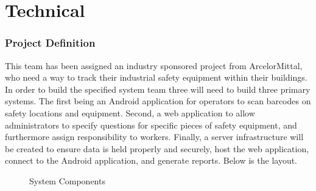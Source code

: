 \documentclass[Letter,11pt]{article}
\begin{document}
\part{Technical}
\section{Project Definition}\label{def}
	This team has been assigned an industry sponsored project from ArcelorMittal, who need a way to track their industrial safety equipment within their buildings. In order to build the specified system team three will need to build three primary systems. The first being an Android application for operators to scan barcodes on safety locations and equipment. Second, a web application to allow administrators to specify questions for specific pieces of safety equipment, and furthermore assign responsibility to workers. Finally, a server infrastructure will be created to ensure data is held properly and securely, host the web application, connect to the Android application, and generate reports. Below is the layout. 
	\begin{figure}[h]
		\centering
		
		\caption{\label{sysConn} System Components}
	\end{figure}
	
\end{document}
